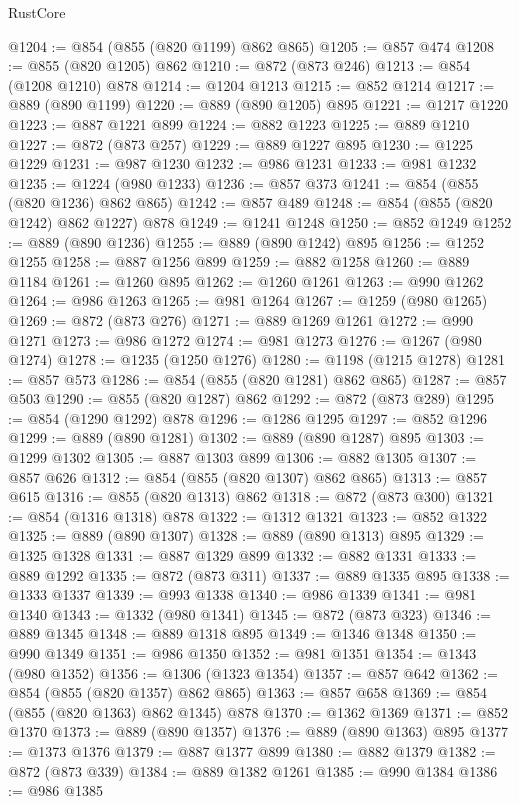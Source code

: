 \begin{lexlean}{RustCore}
\begin{coremodule}
@1204 := @854 (@855 (@820 @1199) @862 @865)
@1205 := @857 @474
@1208 := @855 (@820 @1205) @862
@1210 := @872 (@873 @246)
@1213 := @854 (@1208 @1210) @878
@1214 := @1204 @1213
@1215 := @852 @1214
@1217 := @889 (@890 @1199)
@1220 := @889 (@890 @1205) @895
@1221 := @1217 @1220
@1223 := @887 @1221 @899
@1224 := @882 @1223
@1225 := @889 @1210
@1227 := @872 (@873 @257)
@1229 := @889 @1227 @895
@1230 := @1225 @1229
@1231 := @987 @1230
@1232 := @986 @1231
@1233 := @981 @1232
@1235 := @1224 (@980 @1233)
@1236 := @857 @373
@1241 := @854 (@855 (@820 @1236) @862 @865)
@1242 := @857 @489
@1248 := @854 (@855 (@820 @1242) @862 @1227) @878
@1249 := @1241 @1248
@1250 := @852 @1249
@1252 := @889 (@890 @1236)
@1255 := @889 (@890 @1242) @895
@1256 := @1252 @1255
@1258 := @887 @1256 @899
@1259 := @882 @1258
@1260 := @889 @1184
@1261 := @1260 @895
@1262 := @1260 @1261
@1263 := @990 @1262
@1264 := @986 @1263
@1265 := @981 @1264
@1267 := @1259 (@980 @1265)
@1269 := @872 (@873 @276)
@1271 := @889 @1269 @1261
@1272 := @990 @1271
@1273 := @986 @1272
@1274 := @981 @1273
@1276 := @1267 (@980 @1274)
@1278 := @1235 (@1250 @1276)
@1280 := @1198 (@1215 @1278)
@1281 := @857 @573
@1286 := @854 (@855 (@820 @1281) @862 @865)
@1287 := @857 @503
@1290 := @855 (@820 @1287) @862
@1292 := @872 (@873 @289)
@1295 := @854 (@1290 @1292) @878
@1296 := @1286 @1295
@1297 := @852 @1296
@1299 := @889 (@890 @1281)
@1302 := @889 (@890 @1287) @895
@1303 := @1299 @1302
@1305 := @887 @1303 @899
@1306 := @882 @1305
@1307 := @857 @626
@1312 := @854 (@855 (@820 @1307) @862 @865)
@1313 := @857 @615
@1316 := @855 (@820 @1313) @862
@1318 := @872 (@873 @300)
@1321 := @854 (@1316 @1318) @878
@1322 := @1312 @1321
@1323 := @852 @1322
@1325 := @889 (@890 @1307)
@1328 := @889 (@890 @1313) @895
@1329 := @1325 @1328
@1331 := @887 @1329 @899
@1332 := @882 @1331
@1333 := @889 @1292
@1335 := @872 (@873 @311)
@1337 := @889 @1335 @895
@1338 := @1333 @1337
@1339 := @993 @1338
@1340 := @986 @1339
@1341 := @981 @1340
@1343 := @1332 (@980 @1341)
@1345 := @872 (@873 @323)
@1346 := @889 @1345
@1348 := @889 @1318 @895
@1349 := @1346 @1348
@1350 := @990 @1349
@1351 := @986 @1350
@1352 := @981 @1351
@1354 := @1343 (@980 @1352)
@1356 := @1306 (@1323 @1354)
@1357 := @857 @642
@1362 := @854 (@855 (@820 @1357) @862 @865)
@1363 := @857 @658
@1369 := @854 (@855 (@820 @1363) @862 @1345) @878
@1370 := @1362 @1369
@1371 := @852 @1370
@1373 := @889 (@890 @1357)
@1376 := @889 (@890 @1363) @895
@1377 := @1373 @1376
@1379 := @887 @1377 @899
@1380 := @882 @1379
@1382 := @872 (@873 @339)
@1384 := @889 @1382 @1261
@1385 := @990 @1384
@1386 := @986 @1385

\end{coremodule}
\end{lexlean}
